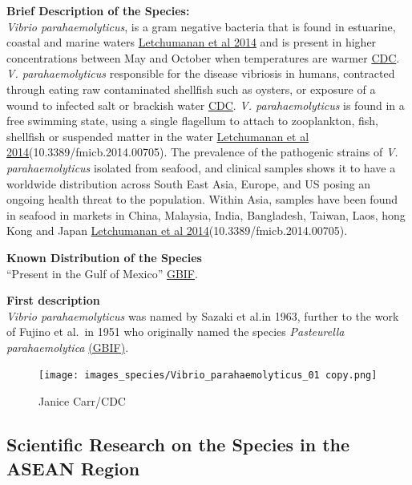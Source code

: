 \documentclass[]{book}
\theoremstyle{definition}
\theoremstyle{definition}
\theoremstyle{definition}
\theoremstyle{remark}
\begin{document}
\textbf{Brief Description of the Species:}\\
\emph{Vibrio parahaemolyticus}, is a gram negative bacteria that is
found in estuarine, coastal and marine waters
\href{https://www.ncbi.nlm.nih.gov/pmc/articles/PMC4263241/}{Letchumanan
et al 2014} and is present in higher concentrations between May and
October when temperatures are warmer
\href{https://www.cdc.gov/vibrio/faq.html}{CDC}. \emph{V.
parahaemolyticus} responsible for the disease vibriosis in humans,
contracted through eating raw contaminated shellfish such as oysters, or
exposure of a wound to infected salt or brackish water
\href{https://www.cdc.gov/vibrio/faq.html}{CDC}. \emph{V.
parahaemolyticus} is found in a free swimming state, using a single
flagellum to attach to zooplankton, fish, shellfish or suspended matter
in the water
\href{https://www.ncbi.nlm.nih.gov/pmc/articles/PMC4263241/}{Letchumanan
et al 2014}(10.3389/fmicb.2014.00705). The prevalence of the pathogenic
strains of \emph{V. parahaemolyticus} isolated from seafood, and
clinical samples shows it to have a worldwide distribution across South
East Asia, Europe, and US posing an ongoing health threat to the
population. Within Asia, samples have been found in seafood in markets
in China, Malaysia, India, Bangladesh, Taiwan, Laos, hong Kong and Japan
\href{https://www.ncbi.nlm.nih.gov/pmc/articles/PMC4263241/}{Letchumanan
et al 2014}(10.3389/fmicb.2014.00705).

\textbf{Known Distribution of the Species}\\
``Present in the Gulf of Mexico''
\href{http://www.gbif.org/species/5427673}{GBIF}.

\textbf{First description}\\
\emph{Vibrio parahaemolyticus} was named by Sazaki et al.in 1963,
further to the work of Fujino et al.~in 1951 who originally named the
species \emph{Pasteurella parahaemolytica}
\href{https://www.gbif.org/species/5427673}{(GBIF)}.

\begin{figure}
\centering
\texttt{[image: images\_species/Vibrio\_parahaemolyticus\_01 copy.png]}
\caption{Janice Carr/CDC}
\end{figure}

\hypertarget{scientific-research-on-the-species-in-the-asean-region-7}{%
\subsection{Scientific Research on the Species in the ASEAN
Region}\label{scientific-research-on-the-species-in-the-asean-region-7}}
\end{document}
